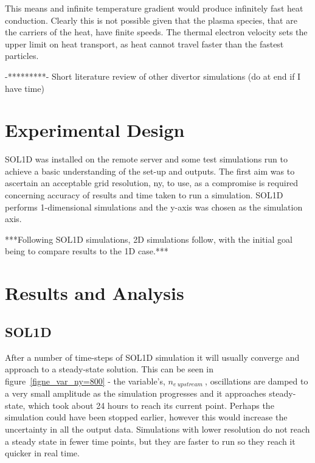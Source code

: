\documentclass[11pt]{article}  %
\providecommand{\neupstream}{$n_{e~upstream}~$} %
\begin{document}
This means and infinite temperature gradient would produce infinitely fast heat conduction. Clearly this is not possible given that the plasma species, that are the carriers of the heat, have finite speeds. The thermal electron velocity sets the upper limit on heat transport, as heat cannot travel faster than the fastest particles. 


-*********- Short literature review of other divertor simulations (do at end if I have time) 

\section{Experimental Design}\label{secExpt}
SOL1D was installed on the remote server and some test simulations run to achieve a basic understanding of the set-up and outputs. The first aim was to ascertain an acceptable grid resolution, ny, to use, as a compromise is required concerning accuracy of results and time taken to run a simulation. SOL1D performs 1-dimensional simulations and the y-axis was chosen as the simulation axis. 

***Following SOL1D simulations, 2D simulations follow, with the initial goal being to compare results to the 1D case.***

\section{Results and Analysis}\label{secResults}
\subsection{SOL1D}\label{ssecSOL1D}
After a number of time-steps of SOL1D simulation it will usually converge and approach to a steady-state solution. This can be seen in figure~\ref{figne_var_ny=800} - the variable's, \neupstream, oscillations are damped to a very small amplitude as the simulation progresses and it approaches steady-state, which took about 24 hours to reach its current point. Perhaps the simulation could have been stopped earlier, however this would increase the uncertainty in all the output data. Simulations with lower resolution do not reach a steady state in fewer time points, but they are faster to run so they reach it quicker in real time.
\end{document}
